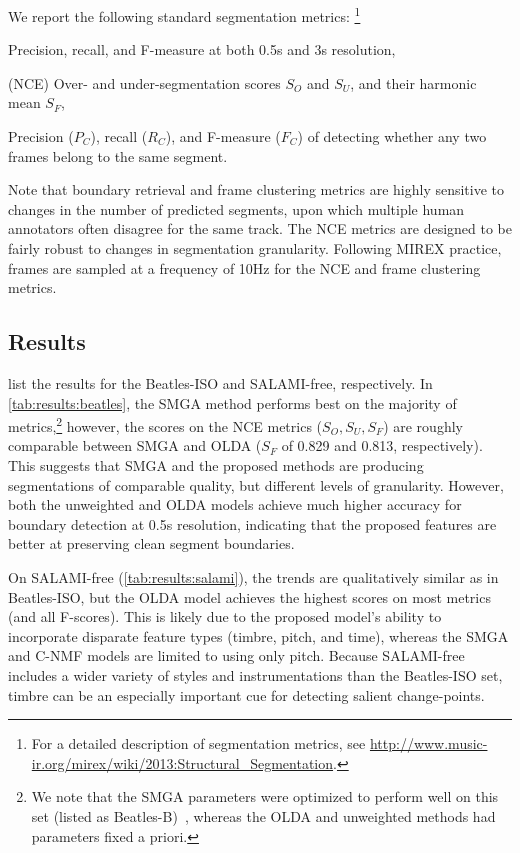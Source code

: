 \documentclass{article}
\begin{document}
We report the following standard segmentation metrics:
\footnote{For a detailed description of segmentation metrics, see
\url{http://www.music-ir.org/mirex/wiki/2013:Structural\_Segmentation}.}
\begin{description}\addtolength{\itemsep}{-0.25\baselineskip}%
\item[boundary retrieval] Precision, recall, and F-measure at both 0.5s and 3s resolution,
\item[normalized conditional entropy] (NCE) Over- and under-segmentation scores $S_O$ and $S_U$, and their harmonic mean $S_F$,
\item[frame clustering] Precision ($P_C$), recall ($R_C$), and F-measure ($F_C$) of detecting whether any two frames belong to the same
segment.
\end{description}
Note that boundary retrieval and frame clustering metrics are highly sensitive to changes in the number of
predicted segments, upon which multiple human annotators often disagree for the same track. 
The NCE metrics are designed to be fairly robust to changes in segmentation granularity.
Following MIREX practice, frames are sampled at a frequency of 10Hz for the NCE and frame clustering metrics. 


\subsection{Results}
\label{sec:results}
 list the results for the Beatles-ISO and SALAMI-free, respectively.
In \cref{tab:results:beatles}, the SMGA method performs best on the majority of metrics,\footnote{We
note that the SMGA parameters were optimized to perform well on this set (listed as
Beatles-B)~\cite{serra2012unsupervised}, whereas the OLDA and unweighted methods had parameters fixed a priori.}
however, the scores on the NCE metrics ($S_O, S_U, S_F$) are roughly comparable between SMGA and OLDA ($S_F$ of 0.829
and 0.813, respectively). 
This suggests that SMGA and the proposed methods are producing segmentations of comparable quality, but 
different levels of granularity.
However, both the unweighted and OLDA models achieve much higher accuracy for boundary detection at 0.5s resolution,
indicating that the proposed features are better at preserving clean segment boundaries.  

On SALAMI-free (\cref{tab:results:salami}), the trends are qualitatively similar as in Beatles-ISO, but the OLDA
model achieves the highest scores on most metrics (and all F-scores). This is likely due to the proposed model's
ability to incorporate disparate feature types (timbre, pitch, and time), whereas the SMGA and C-NMF models are
limited to using only pitch. 
Because SALAMI-free includes a wider variety of styles and instrumentations than the Beatles-ISO set, 
timbre can be an especially important cue for detecting salient change-points.
\end{document}
